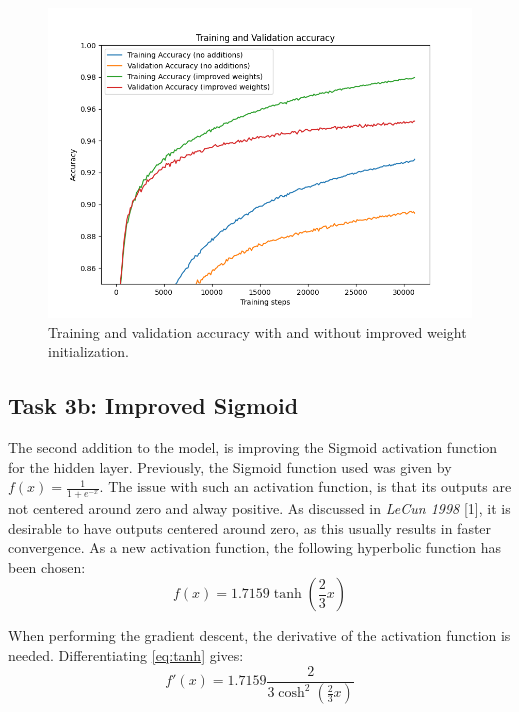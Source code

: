 \documentclass{article}
\begin{document}
\begin{figure}[H]
    \centering
    \includegraphics[width=\textwidth]{Assignments/Assignment_2/plots/task3/3a_accuracy.png}
    \caption{Training and validation accuracy with and without improved weight initialization.}
    \label{fig:3a_acc}
\end{figure}

\subsection{Task 3b: Improved Sigmoid}

The second addition to the model, is improving the Sigmoid activation function for the hidden layer. Previously, the Sigmoid function used was given by $f(x) = \frac{1}{1 + e^{-x}}$. The issue with such an activation function, is that its outputs are not centered around zero and alway positive. As discussed in \textit{LeCun 1998} [1], it is desirable to have outputs centered around zero, as this usually results in faster convergence. As a new activation function, the following hyperbolic function has been chosen: 
\begin{equation}
    f(x) = 1.7159 \tanh{(\frac{2}{3}x)}
    \label{eq:tanh}
\end{equation}


When performing the gradient descent, the derivative of the activation function is needed. Differentiating \eqref{eq:tanh} gives:
\begin{equation}
    f'(x) = 1.7159 \frac{2}{3 \cosh^2{(\frac{2}{3}x)}}
    \label{eq:tanh-der}
\end{equation}
\end{document}

